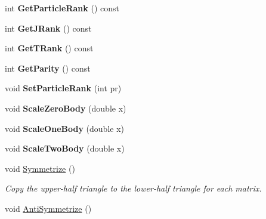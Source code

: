 \begin{DoxyCompactItemize}
\item 
\hypertarget{classOperator_a16a917d45b7d8c03868b6cd80b9efe7f}{int {\bfseries Get\-Particle\-Rank} () const }\label{classOperator_a16a917d45b7d8c03868b6cd80b9efe7f}

\item 
\hypertarget{classOperator_a5f12467caae7d72bad32ea5b7c378899}{int {\bfseries Get\-J\-Rank} () const }\label{classOperator_a5f12467caae7d72bad32ea5b7c378899}

\item 
\hypertarget{classOperator_af01419ad8d7a4097f5520ae6d533e93f}{int {\bfseries Get\-T\-Rank} () const }\label{classOperator_af01419ad8d7a4097f5520ae6d533e93f}

\item 
\hypertarget{classOperator_a7b3d8e2ca9f0ba631b59220cf04dbe39}{int {\bfseries Get\-Parity} () const }\label{classOperator_a7b3d8e2ca9f0ba631b59220cf04dbe39}

\item 
\hypertarget{classOperator_a77eb97b1309a1c4e20101217903b9771}{void {\bfseries Set\-Particle\-Rank} (int pr)}\label{classOperator_a77eb97b1309a1c4e20101217903b9771}

\item 
\hypertarget{classOperator_a3a25803bc77344396f2dd0e75d2a020d}{void {\bfseries Scale\-Zero\-Body} (double x)}\label{classOperator_a3a25803bc77344396f2dd0e75d2a020d}

\item 
\hypertarget{classOperator_a5466cc965277b75b14b60918f4d652ab}{void {\bfseries Scale\-One\-Body} (double x)}\label{classOperator_a5466cc965277b75b14b60918f4d652ab}

\item 
\hypertarget{classOperator_af1f244c4856d11c21f94b6c6cd24a555}{void {\bfseries Scale\-Two\-Body} (double x)}\label{classOperator_af1f244c4856d11c21f94b6c6cd24a555}

\item 
\hypertarget{classOperator_a98d4075d734523186162492a4a45b420}{void \hyperlink{classOperator_a98d4075d734523186162492a4a45b420}{Symmetrize} ()}\label{classOperator_a98d4075d734523186162492a4a45b420}

\begin{DoxyCompactList}\small\item\em Copy the upper-\/half triangle to the lower-\/half triangle for each matrix. \end{DoxyCompactList}\item 
\hypertarget{classOperator_a21a37daa051c248109153e6502b8280f}{void \hyperlink{classOperator_a21a37daa051c248109153e6502b8280f}{Anti\-Symmetrize} ()}\label{classOperator_a21a37daa051c248109153e6502b8280f}


\end{DoxyCompactItemize}
